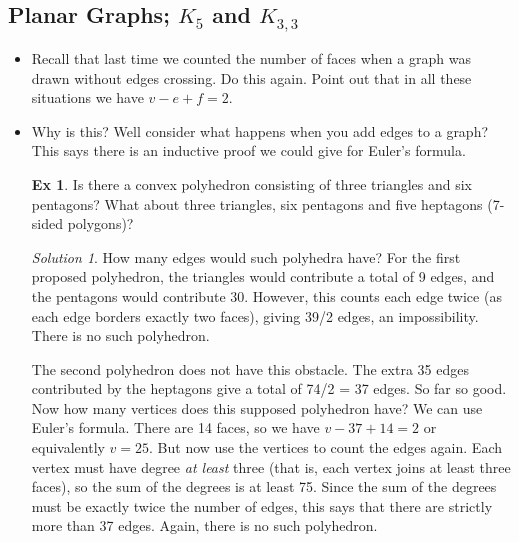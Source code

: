 \documentclass[12pt]{article}
\theoremstyle{plain}
\theoremstyle{definition}
\newtheorem*{example}{Ex}
\theoremstyle{remark}
\newtheorem*{solution}{Solution}
\begin{document}
\subsection*{Planar Graphs; $K_5$ and $K_{3,3}$}
\begin{itemize}

\item Recall that last time we counted the number of faces when a graph was drawn without edges crossing.  Do this again.  Point out that in all these situations we have $v - e + f = 2$.

\item Why is this?  Well consider what happens when you add edges to a graph?  This says there is an inductive proof we could give for Euler's formula.

\begin{example}
  Is there a convex polyhedron consisting of three triangles and six pentagons?  What about three triangles, six pentagons and five heptagons (7-sided polygons)?

  \begin{solution}
  How many edges would such polyhedra have?  For the first proposed polyhedron, the triangles would contribute a total of 9 edges, and the pentagons would contribute 30.  However, this counts each edge twice (as each edge borders exactly two faces), giving 39/2 edges, an impossibility.  There is no such polyhedron.

  The second polyhedron does not have this obstacle. The extra 35 edges contributed by the heptagons give a total of 74/2 = 37 edges.  So far so good.  Now how many vertices does this supposed polyhedron have?  We can use Euler's formula.  There are 14 faces, so we have $v - 37 + 14 = 2$ or equivalently $v = 25$.  But now use the vertices to count the edges again.  Each vertex must have degree \emph{at least} three (that is, each vertex joins at least three faces), so the sum of the degrees is at least 75.  Since the sum of the degrees must be exactly twice the number of edges, this says that there are strictly more than 37 edges.  Again, there is no such polyhedron.
  \end{solution}
   \end{example}


\end{itemize}
\end{document}
